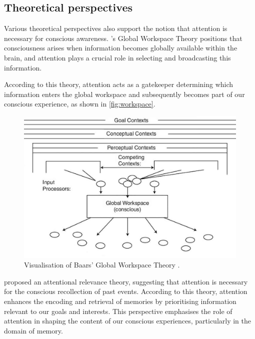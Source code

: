 \documentclass[10pt]{article}
\begin{document}
\begin{sloppypar}
  \subsection{Theoretical perspectives}
  \label{sec:theoretical}

  Various theoretical perspectives also support the notion that attention is necessary for conscious awareness. \citeauthor{baars_essential_1997}’s \citeyearpar{baars_essential_1997} Global Workspace Theory positions that consciousness arises when information becomes globally available within the brain, and attention plays a crucial role in selecting and broadcasting this information.

  \newpage

  According to this theory, attention acts as a gatekeeper determining which information enters the global workspace and subsequently becomes part of our conscious experience, as shown in \autoref{fig:workspace}.

  \begin{figure}[ht]
    \centering
    \includegraphics[width=\textwidth]{figures/global-workspace.jpg}
    \caption[Visualisation of Baars’ Global Workspace Theory.]{Visualisation of Baars’ Global Workspace Theory \citep{sun_computational_2007}.}
    \label{fig:workspace}
  \end{figure}

  \cite{de_brigard_role_2012} proposed an attentional relevance theory, suggesting that attention is necessary for the conscious recollection of past events. According to this theory, attention enhances the encoding and retrieval of memories by prioritising information relevant to our goals and interests. This perspective emphasises the role of attention in shaping the content of our conscious experiences, particularly in the domain of memory.


\end{sloppypar}
\end{document}
